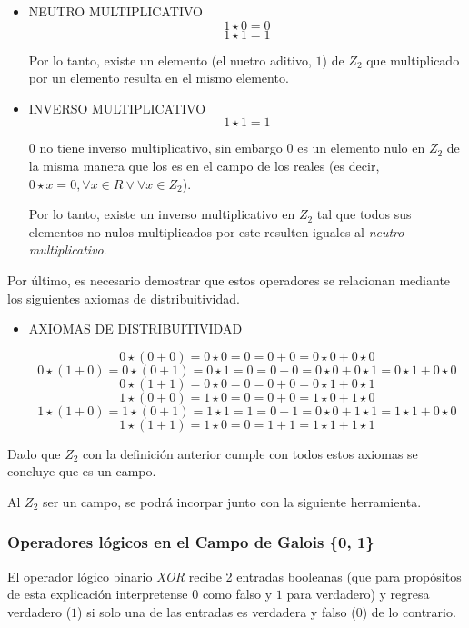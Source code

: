 \documentclass{article}
\begin{document}
\begin{itemize}
    \item NEUTRO MULTIPLICATIVO
$$
1 \star 0 = 0
$$$$
1 \star 1 = 1
$$

Por lo tanto, existe un elemento (el nuetro aditivo, $1$) de $Z_2$ que multiplicado por un elemento resulta en el mismo elemento.

    \item INVERSO MULTIPLICATIVO
$$
1 \star 1 = 1
$$

$0$ no tiene inverso multiplicativo, sin embargo $0$ es un elemento nulo en $Z_2$ de la misma manera que los es en el campo de los reales (es decir, $0 \star x = 0, \forall x \in R \lor \forall x \in Z_2$).

Por lo tanto, existe un inverso multiplicativo en $Z_2$ tal que todos sus elementos no nulos multiplicados por este resulten iguales al \textit{neutro multiplicativo}.
\end{itemize}

Por último, es necesario demostrar que estos operadores se relacionan mediante los siguientes axiomas de distribuitividad.

\begin{itemize}
    \item AXIOMAS DE DISTRIBUITIVIDAD

$$
0 \star ( 0 + 0 ) = 0 \star 0 = 0 = 0 + 0 = 0 \star 0 + 0 \star 0
$$$$
0 \star (1 + 0) = 0 \star ( 0 + 1 ) = 0 \star 1 = 0 = 0 + 0 = 0 \star 0 + 0 \star 1 = 0 \star 1 + 0 \star 0
$$$$
0 \star ( 1 + 1 ) = 0 \star 0 = 0 = 0 + 0 = 0 \star 1 + 0 \star 1
$$$$
1 \star ( 0 + 0 ) = 1 \star 0 = 0 = 0 + 0 = 1 \star 0 + 1 \star 0
$$$$
1 \star (1 + 0) = 1 \star ( 0 + 1 ) = 1 \star 1 = 1 = 0 + 1 = 0 \star 0 + 1 \star 1 = 1 \star 1 + 0 \star 0
$$$$
1 \star ( 1 + 1 ) = 1 \star 0 = 0 = 1 + 1 = 1 \star 1 + 1 \star 1
$$

\end{itemize}

Dado que $Z_2$ con la definición anterior cumple con todos estos axiomas se concluye que es un campo.

Al $Z_2$ ser un campo, se podrá incorpar junto con la siguiente herramienta.

\subsubsection{Operadores lógicos en el Campo de Galois \{0, 1\}}

El operador lógico binario \textit{XOR} recibe 2 entradas booleanas (que para propósitos de esta explicación interpretense $0$ como falso y $1$ para verdadero) y regresa verdadero ($1$) si solo una de las entradas es verdadera y falso ($0$) de lo contrario.
\end{document}
